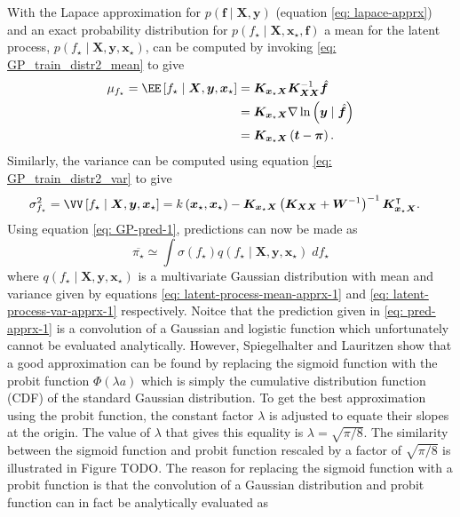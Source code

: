 With the Lapace approximation for $p \left( \bm{f} \mid \bm{X} , \bm{y} \right)$ (equation \ref{eq: lapace-apprx}) and an exact probability distribution for $p \left( f_{\star} \mid \bm{X} , \bm{x}_{\star}, \bm{f} \right)$ a mean for the latent process, $p \left( f_{\star} \mid \bm{X} , \bm{y} , \bm{x}_{\star} \right)$, can be computed by invoking \ref{eq: GP_train_distr2_mean} to give
\begin{align}
    \mu_{f_{\star}} = \EE \left[ f_{\star} \mid \bm{X} , \bm{y} , \bm{x}_{\star} \right]
     & = \bm{K}_{\bm{x}_{\star} \bm{X}} \bm{K}_{\bm{X} \bm{X}}^{-1} \hat{\bm{f}}           \nonumber               \\
     & = \bm{K}_{\bm{x}_{\star} \bm{X}} \nabla \ln \left( \bm{y} \mid \hat{\bm{f}} \right) \nonumber               \\
     & = \bm{K}_{\bm{x}_{\star} \bm{X}} \left( \bm{t} - \bm{\pi} \right) \label{eq: latent-process-mean-apprx-1} .
\end{align}
Similarly, the variance can be computed using equation \ref{eq: GP_train_distr2_var} to give
\begin{align} \label{eq: latent-process-var-apprx-1}
    \sigma_{f_{\star}}^2 = \VV \left[ f_{\star} \mid \bm{X} , \bm{y} , \bm{x}_{\star} \right]
     & = k \left( \bm{x}_{\star} , \bm{x}_{\star} \right) - \bm{K}_{\bm{x}_{\star} \bm{X}} \left( \bm{K}_{\bm{X} \bm{X}} + \bm{W}^{-1} \right)^{-1} \bm{K}_{\bm{x}_{\star} \bm{X}}^{\intercal}.
\end{align}
Using equation \ref{eq: GP-pred-1}, predictions can now be made as
\begin{equation} \label{eq: pred-apprx-1}
    \overline{\pi_{\star}} \simeq \int \sigma \left( f_{\star} \right) q \left( f_{\star} \mid \bm{X} , \bm{y} , \bm{x}_{\star} \right) \; d f_{\star}
\end{equation}
where $q \left( f_{\star} \mid \bm{X} , \bm{y} , \bm{x}_{\star} \right)$ is a multivariate Gaussian distribution with mean and variance given by equations \ref{eq: latent-process-mean-apprx-1} and \ref{eq: latent-process-var-apprx-1} respectively. Noitce that the prediction given in \ref{eq: pred-apprx-1} is a convolution of a Gaussian and logistic function which unfortunately cannot be evaluated analytically. However, Spiegelhalter and Lauritzen \cite{spiegelhalter1990sequential} show that a good approximation can be found by replacing the sigmoid function with the probit function $\Phi \left( \lambda a \right)$ which is simply the cumulative distribution function (CDF) of the standard Gaussian distribution. To get the best approximation using the probit function, the constant factor $\lambda$ is adjusted to equate their slopes at the origin. The value of $\lambda$ that gives this equality is $\lambda = \sqrt{\pi / 8}$. The similarity between the sigmoid function and probit function rescaled by a factor of $\sqrt{\pi / 8}$ is illustrated in Figure TODO. The reason for replacing the sigmoid function with a probit function is that the convolution of a Gaussian distribution and probit function can in fact be analytically evaluated as
